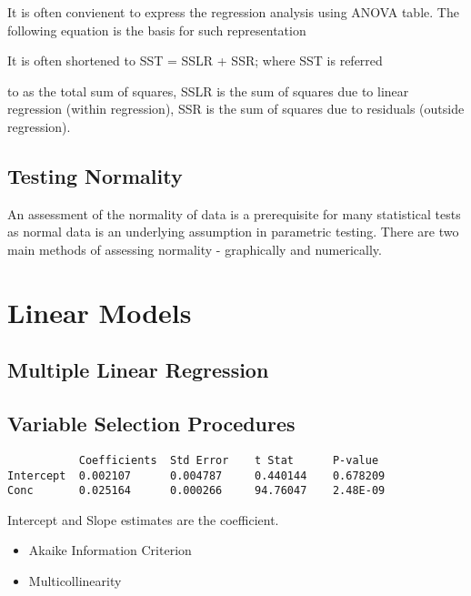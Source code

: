 \documentclass[12pt, a4paper]{report}
\theoremstyle{plain}
\theoremstyle{definition}
\theoremstyle{remark}
\begin{document}
It is often convienent to express the regression analysis using
ANOVA table. The following equation is the basis for such
representation

It is often shortened to SST = SSLR + SSR; where SST is referred

to as the total sum of squares, SSLR is the sum of squares due to
linear regression (within regression), SSR is the sum of squares
due to residuals (outside regression).




\section{Testing Normality}
An assessment of the normality of data is a prerequisite for many statistical tests as normal data is an underlying assumption in parametric testing. There are two main methods of assessing normality - graphically and numerically.


\chapter{Linear Models}
\section{Multiple Linear Regression}
\section{Variable Selection Procedures}

\begin{verbatim}
           Coefficients  Std Error    t Stat      P-value
Intercept  0.002107      0.004787     0.440144    0.678209
Conc       0.025164      0.000266     94.76047    2.48E-09
\end{verbatim}

Intercept and Slope estimates are the coefficient.

\begin{itemize}
\item Akaike Information Criterion
\item Multicollinearity
\end{itemize}
\end{document}
